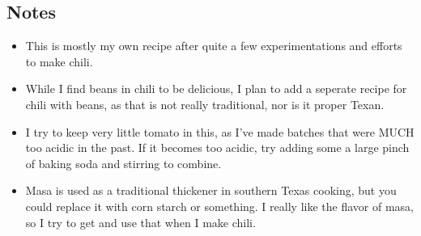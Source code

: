 \begin{multicols}{2}
\subsection*{Notes}
\begin{itemize}
    \item This is mostly my own recipe after quite a few experimentations and efforts to make chili.
    \item While I find beans in chili to be delicious, I plan to add a seperate recipe for chili with beans, as that is not really traditional, nor is it proper Texan.
    \item I try to keep very little tomato in this, as I've made batches that were MUCH too acidic in the past. If it becomes too acidic, try adding some a large pinch of baking soda and stirring to combine.
    \item Masa is used as a traditional thickener in southern Texas cooking, but you could replace it with corn starch or something. I really like the flavor of masa, so I try to get and use that when I make chili.
\end{itemize}
\end{multicols}
\clearpage
